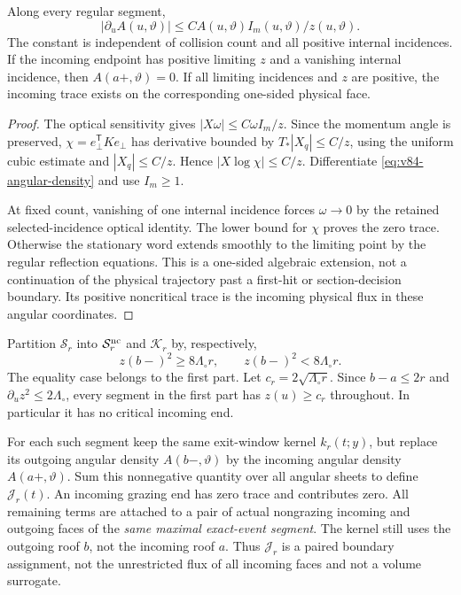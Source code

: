 \begin{lemma}
\label{lem:v84-angular-variation}
Along every regular segment,
\begin{equation}\label{eq:v84-angular-variation}
 |\partial_u A(u,\vartheta)|
                    \le C A(u,\vartheta)I_m(u,\vartheta)/z(u,\vartheta).
\end{equation}
The constant is independent of collision count and all positive
internal incidences. If the incoming endpoint has positive limiting
$z$ and a vanishing internal incidence, then $A(a+,\vartheta)=0$.
If all limiting incidences and $z$ are positive, the incoming trace
exists on the corresponding one-sided physical face.
\end{lemma}
\begin{proof}
The optical sensitivity gives $|X\omega|\le C\omega I_m/z$.
Since the momentum angle is preserved,
$\chi=e_\perp^{\mathsf T}Ke_\perp$ has derivative bounded by
$T_*|X_q|\le C/z$, using the uniform cubic estimate and
$|X_q|\le C/z$. Hence $|X\log\chi|\le C/z$. Differentiate
\eqref{eq:v84-angular-density} and use $I_m\ge1$.

At fixed count, vanishing of one internal incidence forces
$\omega\to0$ by the retained selected-incidence optical identity.
The lower bound for $\chi$ proves the zero trace. Otherwise the
stationary word extends smoothly to the limiting point by the
regular reflection equations. This is a one-sided algebraic extension,
not a continuation of the physical trajectory past a first-hit or
section-decision boundary. Its positive noncritical trace is the
incoming physical flux in these angular coordinates.
\end{proof}

Partition $\mathcal S_r$ into $\mathcal S_r^{\rm nc}$ and
$\mathcal K_r$ by, respectively,
\begin{equation}\label{eq:v84-short-gradient-split}
 z(b-)^2\ge8\Lambda_\circ r,
 \qquad z(b-)^2<8\Lambda_\circ r.
\end{equation}
The equality case belongs to the first part. Let
$c_r=2\sqrt{\Lambda_\circ r}$. Since $b-a\le2r$ and
$\partial_u z^2\le2\Lambda_\circ$, every segment in the first
part has $z(u)\ge c_r$ throughout. In particular it has no critical
incoming end.

For each such segment keep the same exit-window kernel $k_r(t;y)$,
but replace its outgoing angular density $A(b-,\vartheta)$ by the
incoming angular density $A(a+,\vartheta)$. Sum this nonnegative
quantity over all angular sheets to define $\mathcal J_r(t)$.
An incoming grazing end has zero trace and contributes zero. All
remaining terms are attached to a pair of actual nongrazing incoming
and outgoing faces of the \emph{same maximal exact-event segment}.
The kernel still uses the outgoing roof $b$, not the incoming roof
$a$. Thus $\mathcal J_r$ is a paired boundary assignment, not the
unrestricted flux of all incoming faces and not a volume surrogate.

